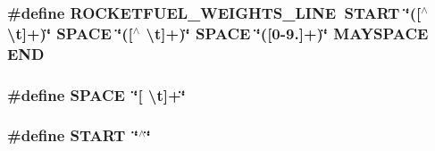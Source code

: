 \subsubsection[{\texorpdfstring{R\+O\+C\+K\+E\+T\+F\+U\+E\+L\+\_\+\+W\+E\+I\+G\+H\+T\+S\+\_\+\+L\+I\+NE}{ROCKETFUEL_WEIGHTS_LINE}}]{\setlength{\rightskip}{0pt plus 5cm}\#define R\+O\+C\+K\+E\+T\+F\+U\+E\+L\+\_\+\+W\+E\+I\+G\+H\+T\+S\+\_\+\+L\+I\+NE~{\bf S\+T\+A\+RT} \char`\"{}(\mbox{[}$^\wedge$ \textbackslash{}t\mbox{]}+)\char`\"{} S\+P\+A\+CE \char`\"{}(\mbox{[}$^\wedge$ \textbackslash{}t\mbox{]}+)\char`\"{} S\+P\+A\+CE \char`\"{}(\mbox{[}0-\/9.\mbox{]}+)\char`\"{} {\bf M\+A\+Y\+S\+P\+A\+CE} {\bf E\+ND}}\hypertarget{rocketfuel-topology-reader_8cc_a3bc3a698d16d454a03f538d762f6a295}{}\label{rocketfuel-topology-reader_8cc_a3bc3a698d16d454a03f538d762f6a295}
\subsubsection[{\texorpdfstring{S\+P\+A\+CE}{SPACE}}]{\setlength{\rightskip}{0pt plus 5cm}\#define S\+P\+A\+CE~\char`\"{}\mbox{[} \textbackslash{}t\mbox{]}+\char`\"{}}\hypertarget{rocketfuel-topology-reader_8cc_a5ff6e798033f03e74730e99f01936f84}{}\label{rocketfuel-topology-reader_8cc_a5ff6e798033f03e74730e99f01936f84}
\subsubsection[{\texorpdfstring{S\+T\+A\+RT}{START}}]{\setlength{\rightskip}{0pt plus 5cm}\#define S\+T\+A\+RT~\char`\"{}$^\wedge$\char`\"{}}\hypertarget{rocketfuel-topology-reader_8cc_a3018c7600b7bb9866400596a56a57af7}{}\label{rocketfuel-topology-reader_8cc_a3018c7600b7bb9866400596a56a57af7}
